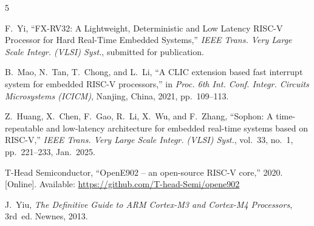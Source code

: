 \documentclass[conference]{IEEEtran}
\begin{document}
\begin{thebibliography}{5}

F.~Yi, ``FX-RV32: A Lightweight, Deterministic and Low Latency RISC-V Processor for Hard Real-Time Embedded Systems,'' \textit{IEEE Trans. Very Large Scale Integr. (VLSI) Syst.}, submitted for publication.

B.~Mao, N.~Tan, T.~Chong, and L.~Li, ``A CLIC extension based fast interrupt system for embedded RISC-V processors,'' in \textit{Proc. 6th Int. Conf. Integr. Circuits Microsystems (ICICM)}, Nanjing, China, 2021, pp.~109--113.

Z.~Huang, X.~Chen, F.~Gao, R.~Li, X.~Wu, and F.~Zhang, ``Sophon: A time-repeatable and low-latency architecture for embedded real-time systems based on RISC-V,'' \textit{IEEE Trans. Very Large Scale Integr. (VLSI) Syst.}, vol.~33, no.~1, pp.~221--233, Jan.~2025.

T-Head Semiconductor, ``OpenE902 -- an open-source RISC-V core,'' 2020. [Online]. Available: \url{https://github.com/T-head-Semi/opene902}

J.~Yiu, \textit{The Definitive Guide to ARM Cortex-M3 and Cortex-M4 Processors}, 3rd~ed. Newnes, 2013.

\end{thebibliography}
\end{document}
